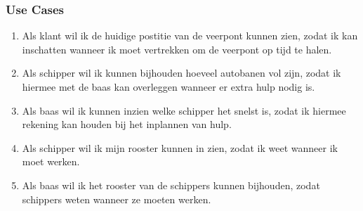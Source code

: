 \documentclass[11pt]{article}
\begin{document}
\subsubsection{Use Cases}
\begin{enumerate}
    \item Als klant wil ik de huidige postitie van de veerpont kunnen zien, zodat ik kan inschatten wanneer ik moet vertrekken om de veerpont op tijd te halen.
    \item Als schipper wil ik kunnen bijhouden hoeveel autobanen vol zijn, zodat ik hiermee met de baas kan overleggen wanneer er extra hulp nodig is.
    \item Als baas wil ik kunnen inzien welke schipper het snelst is, zodat ik hiermee rekening kan houden bij het inplannen van hulp.
    \item Als schipper wil ik mijn rooster kunnen in zien, zodat ik weet wanneer ik moet werken.
    \item Als baas wil ik het rooster van de schippers kunnen bijhouden, zodat schippers weten wanneer ze moeten werken.
\end{enumerate}
\end{document}
